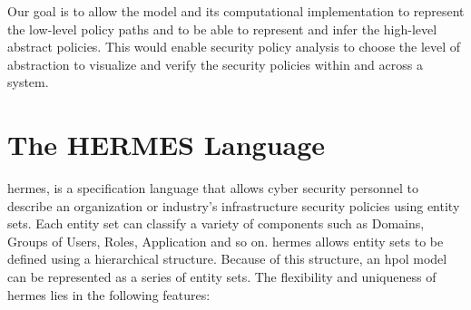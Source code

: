 \documentclass[12pt,letterpaper]{report}
\begin{document}
Our goal is to allow the model and its computational implementation to represent the low-level policy paths and to be able to represent and infer the high-level abstract policies. This would enable security policy analysis to choose the level of abstraction to visualize and verify the security policies within and across a system.

\section{The HERMES Language}
\label{Section:Hermes}


\acf{hermes}, is a specification language that allows cyber security personnel to describe an organization or industry's infrastructure security policies using entity sets. Each entity set can classify a variety of components such as Domains, Groups of Users, Roles, Application and so on. \ac{hermes} allows entity sets to be defined using a hierarchical structure. Because of this structure, an \ac{hpol} model can be represented as a series of entity sets. The flexibility and uniqueness of \ac{hermes} lies in the following features:

\end{document}
